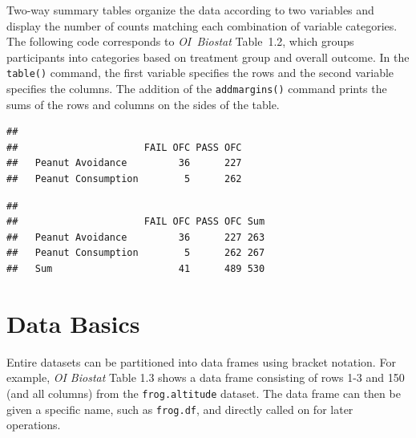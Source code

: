 Two-way summary tables organize the data according to two variables and display the number of counts matching each combination of variable categories. The following code corresponds to \textit{OI~Biostat} Table~1.2, which groups participants into categories based on treatment group and overall outcome. In the \texttt{table()} command, the first variable specifies the rows and the second variable specifies the columns. The addition of the \texttt{addmargins()} command prints the sums of the rows and columns on the sides of the table.

\begin{knitrout}
\color{fgcolor}\begin{kframe}
\begin{alltt}
\hlopt{$}\hlopt{$}
\end{alltt}
\begin{verbatim}
##                     
##                      FAIL OFC PASS OFC
##   Peanut Avoidance         36      227
##   Peanut Consumption        5      262
\end{verbatim}
\begin{alltt}
\hlstd{(}\hlopt{$}\hlopt{$}
\end{alltt}
\begin{verbatim}
##                     
##                      FAIL OFC PASS OFC Sum
##   Peanut Avoidance         36      227 263
##   Peanut Consumption        5      262 267
##   Sum                      41      489 530
\end{verbatim}
\end{kframe}
\end{knitrout}


\section{Data Basics}

Entire datasets can be partitioned into data frames using bracket notation. For example, \textit{OI Biostat} Table 1.3 shows a data frame consisting of rows 1-3 and 150 (and all columns) from the \texttt{frog.altitude} dataset. The data frame can then be given a specific name, such as \texttt{frog.df}, and directly called on for later operations.


